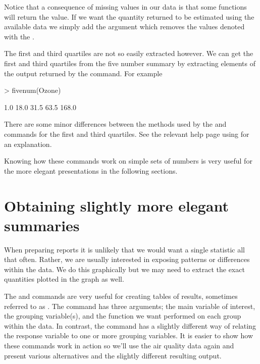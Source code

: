Notice that a consequence of missing values in our data is that some functions will return the  value. If we want the quantity returned to be estimated using the available data we simply add the argument  which removes the values denoted with the . 
 
The first and third quartiles are not so easily extracted however. We can get the first and third quartiles from the five number summary by extracting elements of the output returned by the  command. For example 

\begin{Schunk}
\begin{Sinput}
> fivenum(Ozone) 
\end{Sinput}
\begin{Soutput}
[1]   1.0  18.0  31.5  63.5 168.0
\end{Soutput}
\end{Schunk}

There are some minor differences between the methods used by the  and  commands for the first and third quartiles. See the relevant help page using  for an explanation. 
 
Knowing how these commands work on simple sets of numbers is very useful for the more elegant presentations in the following sections. 
 
\section{Obtaining slightly more elegant summaries} 
 
When preparing reports it is unlikely that we would want a single statistic all that often. Rather, we are usually interested in exposing patterns or differences within the data. We do this graphically but we may need to extract the exact quantities plotted in the graph as well. 
 
The  and  commands are very useful for creating tables of results, sometimes referred to as . The  command has three arguments; the main variable of interest, the grouping variable(s), and the function we want performed on each group within the data. In contrast, the  command has a slightly different way of relating the response variable to one or more grouping variables. It is easier to show how these commands work in action so we'll use the air quality data again and present various alternatives and the slightly different resulting output. 
 
